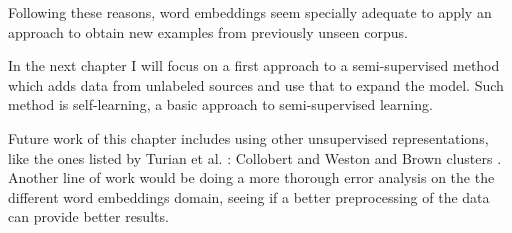 Following these reasons, word embeddings seem specially adequate to apply an
approach to obtain new examples from previously unseen corpus.

In the next chapter I will focus on a first approach to a semi-supervised
method which adds data from unlabeled sources and use that to expand the model.
Such method is self-learning, a basic approach to semi-supervised learning.

Future work of this chapter includes using other unsupervised representations,
like the ones listed by Turian et al. \cite{Turian:2010:WRS:1858681.1858721}:
Collobert and Weston \cite{Collobert:2008:UAN:1390156.1390177} and Brown
clusters \cite{Brown:1992:CNG:176313.176316}. Another line of work would be
doing a more thorough error analysis on the the different word embeddings
domain, seeing if a better preprocessing of the data can provide better
results. 
